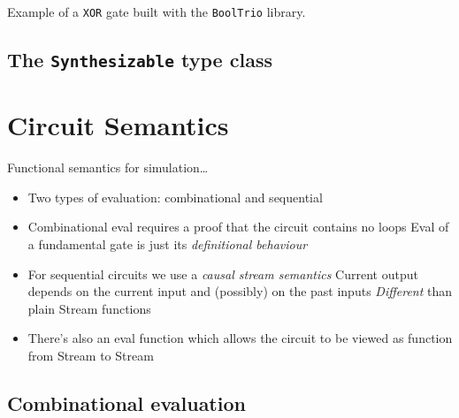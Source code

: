             \begin{listing}[h]
                \newline
                \caption{Example of a \texttt{XOR} gate built with the \texttt{BoolTrio} library.\label{lst:xor-sample}}
            \end{listing}


        \subsection{The \texttt{Synthesizable} type class}
        \label{subsec:synthesizable}



    \section{Circuit Semantics}
    \label{sec:circuit-semantics}
        Functional semantics for simulation\ldots

        \begin{itemize}
            \item Two types of evaluation: combinational and sequential
            \item Combinational eval requires a proof that the circuit contains no loops
                \subitem Eval of a fundamental gate is just its \emph{definitional behaviour}

            \item For sequential circuits we use a \emph{causal stream semantics}
                \subitem Current output depends on the current input and (possibly) on the past inputs
                \subitem \emph{Different} than plain Stream functions

            \item There's also an eval function which allows the circuit to be viewed as function from Stream to Stream
        \end{itemize}

        \subsection{Combinational evaluation}
        \label{subsec:combinational-eval}

